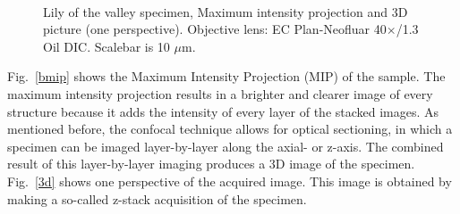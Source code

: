 \begin{figure}[h]
\centering
{}\hspace{0.1em}
\\
\caption{Lily of the valley specimen, Maximum intensity projection and 3D picture (one perspective). 
Objective lens: EC Plan-Neofluar 40$\times$/1.3 Oil DIC. 
Scalebar is 10 $\mu$m.} 
\label{fig:LSMmip3d}
\end{figure}

Fig.~\ref{bmip} shows the Maximum Intensity Projection (MIP) of the sample. 
The maximum intensity projection results in a brighter and clearer image of every structure because it adds the intensity of every layer of the stacked images. 
As mentioned before, the confocal technique allows for optical sectioning, in which a specimen can be imaged layer-by-layer along the axial- or z-axis. 
The combined result of this layer-by-layer imaging produces a 3D image of the specimen. 
Fig.~\ref{3d} shows one perspective of the acquired image. 
This image is obtained by making a so-called z-stack acquisition of the specimen. 

